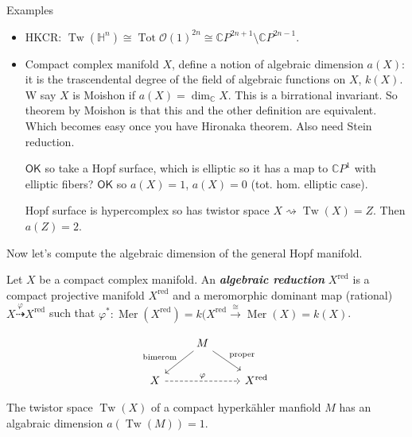 \begin{thing5}{Examples}\leavevmode
	\begin{itemize}
		\item HKCR: $\operatorname{Tw}(\mathbb{H}^n)\cong \operatorname{Tot}\mathcal{O}(1)^{2n}\cong \mathbb{C}P^{2n+1}\setminus \mathbb{C}P^{2n-1}$.
		\item Compact complex manifold $X$, define a notion of algebraic dimension $a(X)$: it is the trascendental degree of the field of algebraic functions on $X$,  $k(X)$. W say  $X$ is Moishon if $a(X)=\dim_\mathbb{C}X$. This is a birrational invariant. So theorem by Moishon is that this and the other definition are equivalent. Which  becomes easy once you have Hironaka theorem. Also need Stein reduction.

			$\mathsf{OK}$ so take a Hopf surface, which is elliptic so it has a map to $\mathbb{C}P^{1}$ with elliptic fibers? $\mathsf{OK}$ so $a(X)=1$,  $a(X)=0$ (tot. hom. elliptic case).

			\begin{thm}[Pontecorro]\leavevmode
				Hopf surface is hypercomplex so has twistor space $X\rightsquigarrow \operatorname{Tw}(X)=Z$. Then $a(Z)=2$.
			\end{thm}
	\end{itemize}
\end{thing5}

Now let's compute the algebraic dimension of the general Hopf manifold.

\begin{defn}\leavevmode
	Let $X$ be a compact complex manifold. An \textit{\textbf{algebraic reduction}} $X^{\operatorname{red}}$ is a compact projective manifold $X^{\operatorname{red}}$ and a meromorphic dominant map (rational) $X \overset{\varphi}{\dashrightarrow}X^{\operatorname{red}}$ such that $\varphi^* :\operatorname{Mer}(X^{\operatorname{red}})=k(X^{\operatorname{red}}\overset{\cong }{\longrightarrow}\operatorname{Mer}(X)=k(X)$.

	\[\begin{tikzcd}
	&M\arrow[dl,"\text{bimerom} ",swap]\arrow[dr,"\text{proper} "]\\
		X\arrow[rr,"\varphi",dashed]&&X^{\operatorname{red}}
	\end{tikzcd}\]
\end{defn}

\begin{thm}[Verbitsky]\leavevmode
	The twistor space $\operatorname{Tw}(X)$ of a compact hyperkähler manfiold $M$ has an algabraic dimension $a(\operatorname{Tw}(M))=1$.
\end{thm}

